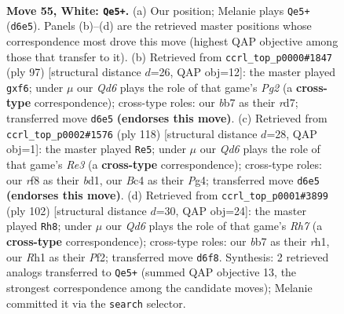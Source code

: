 \documentclass[11pt]{article}
\begin{document}
\clearpage

\begin{figure}[p]\centering
\begin{subfigure}{0.46\textwidth}\centering
\resizebox{\linewidth}{!}{%
\newchessgame
\chessboard[
  setfen={5r2/1b6/3Q4/7k/2B4P/8/1p4P1/6KR w - - 1 55},
  showmover=false,
  pgfstyle=straightmove, color=movearrow, markmove={d6-e5}
]}
\caption{}
\end{subfigure}\hfill
\begin{subfigure}{0.46\textwidth}\centering
\resizebox{\linewidth}{!}{%
\newchessgame
\chessboard[
  setfen={6rk/3R2p1/5R2/7p/7K/7P/8/8 b - - 0 49},
  showmover=false,
  pgfstyle=straightmove, color=movearrow, markmove={g7-f6}
]}
\caption{}
\end{subfigure}
\\[4pt]
\begin{subfigure}{0.46\textwidth}\centering
\resizebox{\linewidth}{!}{%
\newchessgame
\chessboard[
  setfen={5k2/7p/8/3B2p1/1P4P1/4R2P/1r6/3b2K1 w - - 11 60},
  showmover=false,
  pgfstyle=straightmove, color=movearrow, markmove={e3-e5}
]}
\caption{}
\end{subfigure}\hfill
\begin{subfigure}{0.46\textwidth}\centering
\resizebox{\linewidth}{!}{%
\newchessgame
\chessboard[
  setfen={8/3b3R/3k3K/7P/P7/8/5P2/7r w - - 1 52},
  showmover=false,
  pgfstyle=straightmove, color=movearrow, markmove={h7-h8}
]}
\caption{}
\end{subfigure}
\caption{\textbf{Move 55, White: \texttt{Qe5+}.} (a) Our position; Melanie plays \texttt{Qe5+} (\texttt{d6e5}). Panels (b)--(d) are the retrieved master positions whose correspondence most drove this move (highest QAP objective among those that transfer to it). (b) Retrieved from \texttt{ccrl\_top\_p0000\#1847} (ply 97) [structural distance $d$=26, QAP obj=12]: the master played \texttt{gxf6}; under $\mu$ our \emph{Qd6} plays the role of that game's \emph{Pg2} (a \textbf{cross-type} correspondence); cross-type roles: our \emph{b}b7 as their \emph{r}d7; transferred move \texttt{d6e5} \textbf{(endorses this move)}. (c) Retrieved from \texttt{ccrl\_top\_p0002\#1576} (ply 118) [structural distance $d$=28, QAP obj=1]: the master played \texttt{Re5}; under $\mu$ our \emph{Qd6} plays the role of that game's \emph{Re3} (a \textbf{cross-type} correspondence); cross-type roles: our \emph{r}f8 as their \emph{b}d1, our \emph{B}c4 as their \emph{P}g4; transferred move \texttt{d6e5} \textbf{(endorses this move)}. (d) Retrieved from \texttt{ccrl\_top\_p0001\#3899} (ply 102) [structural distance $d$=30, QAP obj=24]: the master played \texttt{Rh8}; under $\mu$ our \emph{Qd6} plays the role of that game's \emph{Rh7} (a \textbf{cross-type} correspondence); cross-type roles: our \emph{b}b7 as their \emph{r}h1, our \emph{R}h1 as their \emph{P}f2; transferred move \texttt{d6f8}. Synthesis: 2 retrieved analogs transferred to \texttt{Qe5+} (summed QAP objective 13, the strongest correspondence among the candidate moves); Melanie committed it via the \texttt{search} selector.}
\label{fig:thought-m108}
\end{figure}
\end{document}
